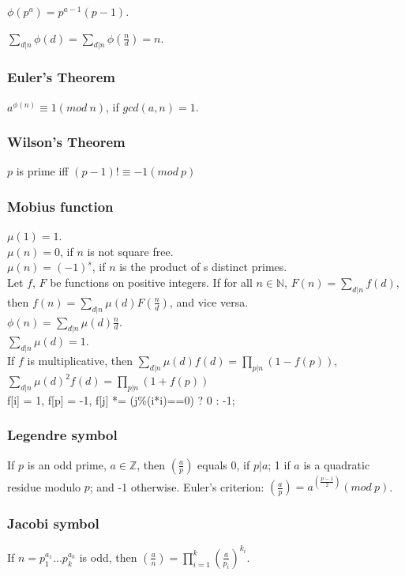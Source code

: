 \documentclass[a4paper,12pt]{article}
\begin{document}
$\phi(p^a) = p^{a-1}(p-1)$.

$\sum_{d|n}\phi(d) = \sum_{d|n}\phi(\frac{n}{d}) = n$.

\subsubsection{Euler's Theorem} 
$a^{\phi(n)} \equiv 1 (mod\ n)$, if $gcd(a,n) = 1$.

\subsubsection{Wilson's Theorem} 
$p$ is prime iff $(p-1)! \equiv -1 (mod\ p)$

\subsubsection{Mobius function}
$\mu(1) = 1$.\\
$\mu(n) = 0$, if $n$ is not square free.\\
$\mu(n) = (-1)^{s}$, if $n$ is the product of s distinct primes.\\
Let $f$, $F$ be functions on positive integers. If for all $n \in \mathbb{N}$, $F(n) = \sum_{d|n}f(d)$, then $f(n) = \sum_{d|n}\mu(d)F(\frac{n}{d})$, and vice versa.\\
$\phi(n) = \sum_{d|n}\mu(d)\frac{n}{d}$.\\
$\sum_{d|n}\mu(d) = 1$.\\
If $f$ is multiplicative, then $\sum_{d|n}\mu(d)f(d) = \prod_{p|n}(1-f(p))$, $\sum_{d|n}\mu(d)^2f(d) = \prod_{p|n}(1+f(p))$\\
f[i] = 1, f[p] = -1, f[j] *= (j\%(i*i)==0) ? 0 : -1;

\subsubsection{Legendre symbol}
If $p$ is an odd prime, $a \in \mathbb{Z}$, then $(\frac{a}{p})$ equals 0, if $p|a$; 1 if $a$ is a quadratic residue modulo $p$; and -1 otherwise. Euler's criterion: $(\frac{a}{p}) = a^{(\frac{p-1}{2})} (mod\ p)$.

\subsubsection{Jacobi symbol}
If $n = p_1^{a_1}...p_k^{a_k}$ is odd, then $(\frac{a}{n}) = \prod_{i=1}^k(\frac{a}{p_i})^{k_i}$.
\end{document}
